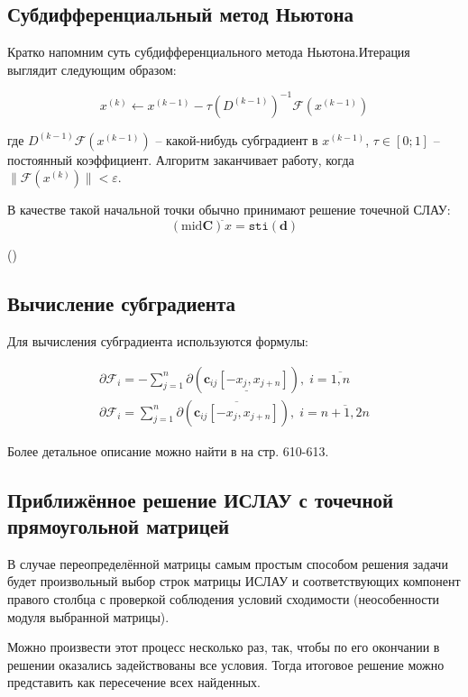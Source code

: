 \subsection{Субдифференциальный метод Ньютона}

Кратко напомним суть субдифференциального метода Ньютона.Итерация выглядит следующим образом:

\begin{equation*}
	x^{(k)} \leftarrow x^{(k - 1)} - \tau(D^{(k - 1)})^{-1}\mathcal{F}(x^{(k - 1)})
\end{equation*}

где $D^{(k - 1)}\mathcal{F}(x^{(k - 1)})$ -- какой-нибудь субградиент в $x^{(k - 1)}$, $\tau \in [0; 1]$ -- постоянный коэффициент. Алгоритм заканчивает работу, когда $\| \mathcal{F}(x^{(k)}) \| < \varepsilon$.

В качестве такой начальной точки обычно принимают решение точечной СЛАУ:
\begin{equation}
(\textrm{mid} \mathbf{C})^{\tilde{}}x = \texttt{sti}(\mathbf{d})
\end{equation}

 (\cite[стр. 607]{shary})

\subsection{Вычисление субградиента}

Для вычисления субградиента используются формулы:

\begin{align}
\partial\mathcal{F}_i=-\sum_{j=1}^{n}\partial(\underline{\mathbf{c}_{ij}[-x_j, x_{j+n}]}), \;i = \overline{1,n} \\
\partial\mathcal{F}_i=\sum_{j=1}^{n}\partial(\overline{\mathbf{c}_{ij}[-x_j, x_{j+n}]}), \;i = \overline{n+1,2n}
\end{align}

Более детальное описание можно найти в \cite{shary} на стр. 610-613.

\subsection{Приближённое решение ИСЛАУ с точечной прямоугольной матрицей}

В случае переопределённой матрицы самым простым способом решения задачи будет произвольный выбор строк матрицы ИСЛАУ и соответствующих компонент правого столбца с проверкой соблюдения условий сходимости (неособенности модуля выбранной матрицы).

Можно произвести этот процесс несколько раз, так, чтобы по его окончании в решении оказались задействованы все условия. Тогда итоговое решение можно представить как пересечение всех найденных.